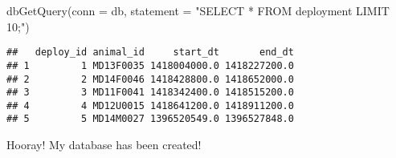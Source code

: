 \documentclass[
]{book}
\newenvironment{Shaded}{\begin{snugshade}}{\end{snugshade}}
\newcommand{\AttributeTok}[1]{\textcolor[rgb]{0.77,0.63,0.00}{#1}}
\newcommand{\FunctionTok}[1]{\textcolor[rgb]{0.00,0.00,0.00}{#1}}
\newcommand{\NormalTok}[1]{#1}
\newcommand{\StringTok}[1]{\textcolor[rgb]{0.31,0.60,0.02}{#1}}
\begin{document}
\begin{Shaded}
\begin{Highlighting}[]
\FunctionTok{dbGetQuery}\NormalTok{(}\AttributeTok{conn =}\NormalTok{ db, }\AttributeTok{statement =} \StringTok{"SELECT * FROM deployment LIMIT 10;"}\NormalTok{)}
\end{Highlighting}
\end{Shaded}

\begin{verbatim}
##   deploy_id animal_id     start_dt       end_dt
## 1         1 MD13F0035 1418004000.0 1418227200.0
## 2         2 MD14F0046 1418428800.0 1418652000.0
## 3         3 MD11F0041 1418342400.0 1418515200.0
## 4         4 MD12U0015 1418641200.0 1418911200.0
## 5         5 MD14M0027 1396520549.0 1396527848.0
\end{verbatim}

Hooray! My database has been created!

  
\end{document}
